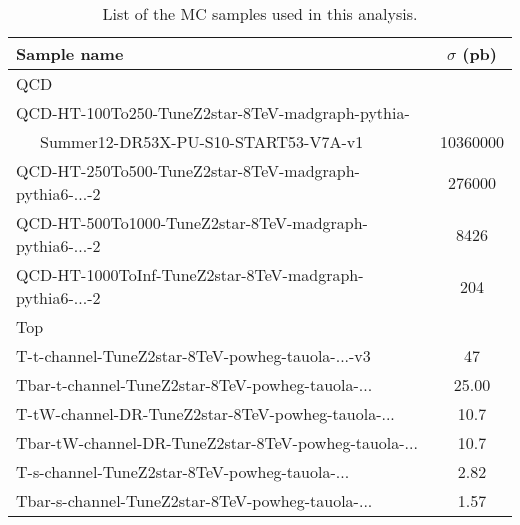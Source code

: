 \begin{table}[!htb]
\begin{center}
\caption{List of the MC samples used in this analysis.}
\label{Tab.MCSamples}
\begin{tabular}{|l|c|}
\hline
Sample name                                                                    & $\sigma$ (pb) \\\hline
QCD &  \\\hline
QCD-HT-100To250-TuneZ2star-8TeV-madgraph-pythia-\\
~~~Summer12-DR53X-PU-S10-START53-V7A-v1    & 10360000 \\
QCD-HT-250To500-TuneZ2star-8TeV-madgraph-pythia6-...-2  & 276000 \\
QCD-HT-500To1000-TuneZ2star-8TeV-madgraph-pythia6-...-2 & 8426 \\
QCD-HT-1000ToInf-TuneZ2star-8TeV-madgraph-pythia6-...-2 & 204 \\\hline


Top &  \\\hline
T-t-channel-TuneZ2star-8TeV-powheg-tauola-...-v3    &  47\\
Tbar-t-channel-TuneZ2star-8TeV-powheg-tauola-...    & 25.00\\
T-tW-channel-DR-TuneZ2star-8TeV-powheg-tauola-...   & 10.7\\
Tbar-tW-channel-DR-TuneZ2star-8TeV-powheg-tauola-...& 10.7\\
T-s-channel-TuneZ2star-8TeV-powheg-tauola-...       & 2.82\\
Tbar-s-channel-TuneZ2star-8TeV-powheg-tauola-...    & 1.57\\


\end{tabular}
\end{center}
\end{table}
